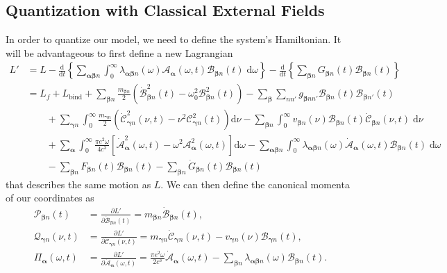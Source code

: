 \documentclass{article}
\begin{document}
\subsection{Quantization with Classical External Fields}\label{sec:quantization}

In order to quantize our model, we need to define the system's Hamiltonian. It will be advantageous to first define a new Lagrangian
\begin{equation}
\begin{split}
L' &= L - \frac{\mathrm{d}}{\mathrm{d}t}\left\{\sum_{\bm{\alpha}\bm{\beta}n}\int_0^\infty\lambda_{\bm{\alpha}\bm{\beta}n}(\omega)\mathcal{A}_{\bm{\alpha}}(\omega,t)\mathcal{B}_{\bm{\beta}n}(t)\;\mathrm{d}\omega\right\} - \frac{\mathrm{d}}{\mathrm{d}t}\left\{\sum_{\bm{\beta}n}G_{\bm{\beta}n}(t)\mathcal{B}_{\bm{\beta}n}(t)\right\}\\
&= L_f + L_\mathrm{bind} + \sum_{\bm{\beta}n}\frac{m_{\bm{\beta}n}}{2}\left(\dot{\mathcal{B}}_{\bm{\beta}n}^2(t) - \omega_0^2\mathcal{B}_{\bm{\beta}n}^2(t)\right) - \sum_{\bm{\beta}}\sum_{nn'}g_{\bm{\beta}nn'}\mathcal{B}_{\bm{\beta}n}(t)\mathcal{B}_{\bm{\beta}n'}(t)\\
&\qquad+ \sum_{\bm{\gamma}n}\int_0^\infty\frac{m_{\bm{\gamma}n}}{2}\left(\dot{\mathcal{C}}_{\bm{\gamma}n}^2(\nu,t) - \nu^2\mathcal{C}_{\bm{\gamma}n}^2(t)\right)\mathrm{d}\nu - \sum_{\bm{\beta}n}\int_0^\infty v_{\bm{\beta}n}(\nu)\mathcal{B}_{\bm{\beta}n}(t)\dot{\mathcal{C}}_{\bm{\beta}n}(\nu,t)\;\mathrm{d}\nu\\
&\qquad + \sum_{\bm{\alpha}}\int_0^\infty\frac{\pi e^2\omega}{4c^3}\left[\dot{\mathcal{A}}_{\bm{\alpha}}^2(\omega,t) - \omega^2\mathcal{A}_{\bm{\alpha}}^2(\omega,t)\right]\mathrm{d}\omega - \sum_{\bm{\alpha}\bm{\beta}n}\int_0^\infty\lambda_{\bm{\alpha}\bm{\beta}n}(\omega)\dot{\mathcal{A}}_{\bm{\alpha}}(\omega,t)\mathcal{B}_{\bm{\beta}n}(t)\;\mathrm{d}\omega\\
&\qquad - \sum_{\bm{\beta}n}F_{\bm{\beta}n}(t)\mathcal{B}_{\bm{\beta}n}(t) - \sum_{\bm{\beta}n}\dot{G}_{\bm{\beta}n}(t)\mathcal{B}_{\bm{\beta}n}(t)
\end{split}
\end{equation}
that describes the same motion as $L$. We can then define the canonical momenta of our coordinates as
\begin{equation}
\begin{split}
\mathcal{P}_{\bm{\beta}n}(t) &= \frac{\partial L'}{\partial \dot{\mathcal{B}}_{\bm{\beta}n}(t)} = m_{\bm{\beta}n}\dot{\mathcal{B}}_{\bm{\beta}n}(t),\\
\mathcal{Q}_{\bm{\gamma}n}(\nu,t) &= \frac{\partial L'}{\partial \dot{\mathcal{C}}_{\bm{\gamma}n}(\nu,t)} = m_{\bm{\gamma}n}\dot{\mathcal{C}}_{\bm{\gamma}n}(\nu,t) - v_{\bm{\gamma}n}(\nu)\mathcal{B}_{\bm{\gamma}n}(t),\\
\mathit{\Pi}_{\bm{\alpha}}(\omega,t) &= \frac{\partial L'}{\partial \dot{\mathcal{A}}_{\bm{\alpha}}(\omega,t)} = \frac{\pi e^2\omega}{2c^3}\dot{\mathcal{A}}_{\bm{\alpha}}(\omega,t) - \sum_{\bm{\beta}n}\lambda_{\bm{\alpha}\bm{\beta}n}(\omega)\mathcal{B}_{\bm{\beta}n}(t).
\end{split}
\end{equation}
\end{document}
